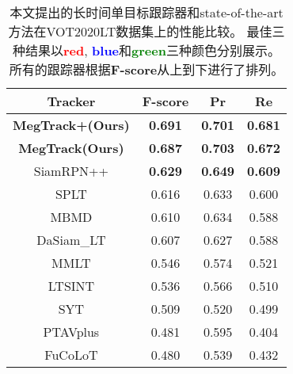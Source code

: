 \documentclass[promaster]{thesis-uestc}
\begin{document}
\begin{table}[htbp!]
    \caption{本文提出的长时间单目标跟踪器和state-of-the-art方法在VOT2020LT数据集上的性能比较。 
    最佳三种结果以\textcolor{red}{\textbf{red}},
    \textcolor{blue}{\textbf{blue}}和\textcolor{green}{\textbf{green}}三种颜色分别展示。
    所有的跟踪器根据\textbf{F-score}从上到下进行了排列。}
    \label{tab-vot20lt}
    \vspace{-3mm}
    \small
    \begin{center}
    \begin{tabular}{cccc}
    \hline
    \textbf{Tracker} & \textbf{F-score}                      & \textbf{Pr}                           & \textbf{Re}                           \\ \hline
    \textbf{MegTrack+(Ours)}             & {\color[HTML]{FE0000} \textbf{0.691}} & {\color[HTML]{3166FF} \textbf{0.701}} & {\color[HTML]{FE0000} \textbf{0.681}} \\
    \textbf{MegTrack(Ours)}             & {\color[HTML]{3166FF} \textbf{0.687}} & {\color[HTML]{FE0000} \textbf{0.703}} & {\color[HTML]{3166FF} \textbf{0.672}} \\
    SiamRPN++        & {\color[HTML]{32CB00} \textbf{0.629}} & {\color[HTML]{32CB00} \textbf{0.649}} & {\color[HTML]{32CB00} \textbf{0.609}} \\
    SPLT             &  0.616 & 0.633                                 & 0.600 \\
    MBMD              & 0.610                                 & 0.634                                 & 0.588                            \\
    DaSiam\_LT       & 0.607                                 & {\color[HTML]{000000} 0.627}          & 0.588       \\
    MMLT                & 0.546                                 & 0.574                                 & 0.521                            \\
    LTSINT              & 0.536                                 & 0.566                                 & 0.510                            \\
    SYT                   & 0.509                                 & 0.520                                 & 0.499                             \\
    PTAVplus           & 0.481                                 & 0.595                                 & 0.404                            \\
    FuCoLoT           & 0.480                                 & 0.539                                 & 0.432                             \\

\end{tabular}
\end{center}
\end{table}
\end{document}
